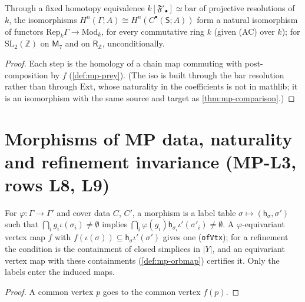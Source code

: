 \begin{theorem}\label{thm:mp-comparison-natural}
  \leanok
  Through a fixed homotopy equivalence $k[\mathfrak F'_\bullet]\simeq\mathrm{bar}$ of projective resolutions of $k$, the isomorphisms
  $H^n(\Gamma;A)\cong H^n(C^\bullet(\mathsf S;A))$ form a natural isomorphism of functors $\mathrm{Rep}_k\Gamma\to\mathrm{Mod}_k$, for every
  commutative ring $k$ (given (AC) over $k$); for $\mathrm{SL}_2(\mathbb Z)$ on $\mathsf M_7$ and on $\mathsf R_{\mathbb Z}$, unconditionally.
\end{theorem}
\begin{proof}
  \leanok
  Each step is the homology of a chain map commuting with post-composition by $f$
  (\ref{def:mp-prey}).  (The iso is built through the bar resolution rather than through $\mathrm{Ext}$, whose naturality in the
  coefficients is not in mathlib; it is an isomorphism with the same source and target as \ref{thm:mp-comparison}.)
\end{proof}

\section{Morphisms of MP data, naturality and refinement invariance (MP-L3, rows L8, L9)}

\begin{definition}\label{def:mp-morph}
  \leanok
  For $\varphi\colon\Gamma\to\Gamma'$ and cover data $C$, $C'$, a morphism is a label table $\sigma\mapsto(\mathsf h_\sigma,\sigma')$
  such that $\bigcap_ig_i\iota(\sigma_i)\neq\emptyset$ implies $\bigcap_i\varphi(g_i)\mathsf h_{\sigma_i}\iota'(\sigma'_i)\neq\emptyset$.  A
  $\varphi$-equivariant vertex map $f$ with $f(\iota(\sigma))\subseteq\mathsf h_\sigma\iota'(\sigma')$ gives one (\texttt{ofVtx}); for a
  refinement the condition is the containment of closed simplices in $|Y|$, and an equivariant vertex map with these
  containments (\ref{def:mp-orbmap}) certifies it.  Only the labels enter the induced maps.
\end{definition}
\begin{proof}
  \leanok
  A common vertex $p$ goes to the common vertex $f(p)$.
\end{proof}

